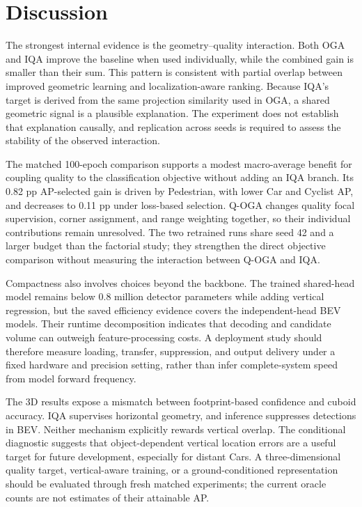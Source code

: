 \section{Discussion}
The strongest internal evidence is the geometry--quality interaction. Both OGA and IQA improve the baseline when used individually, while the combined gain is smaller than their sum. This pattern is consistent with partial overlap between improved geometric learning and localization-aware ranking. Because IQA's target is derived from the same projection similarity used in OGA, a shared geometric signal is a plausible explanation. The experiment does not establish that explanation causally, and replication across seeds is required to assess the stability of the observed interaction.

The matched 100-epoch comparison supports a modest macro-average benefit for coupling quality to the classification objective without adding an IQA branch. Its 0.82 pp AP-selected gain is driven by Pedestrian, with lower Car and Cyclist AP, and decreases to 0.11 pp under loss-based selection. Q-OGA changes quality focal supervision, corner assignment, and range weighting together, so their individual contributions remain unresolved. The two retrained runs share seed 42 and a larger budget than the factorial study; they strengthen the direct objective comparison without measuring the interaction between Q-OGA and IQA.

Compactness also involves choices beyond the backbone. The trained shared-head model remains below 0.8 million detector parameters while adding vertical regression, but the saved efficiency evidence covers the independent-head BEV models. Their runtime decomposition indicates that decoding and candidate volume can outweigh feature-processing costs. A deployment study should therefore measure loading, transfer, suppression, and output delivery under a fixed hardware and precision setting, rather than infer complete-system speed from model forward frequency.

The 3D results expose a mismatch between footprint-based confidence and cuboid accuracy. IQA supervises horizontal geometry, and inference suppresses detections in BEV. Neither mechanism explicitly rewards vertical overlap. The conditional diagnostic suggests that object-dependent vertical location errors are a useful target for future development, especially for distant Cars. A three-dimensional quality target, vertical-aware training, or a ground-conditioned representation should be evaluated through fresh matched experiments; the current oracle counts are not estimates of their attainable AP.

